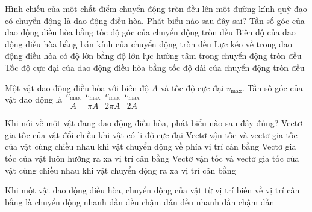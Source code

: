 \begin{ex}
Hình chiếu của một chất điểm chuyển động tròn đều lên một đường kính quỹ đạo có chuyển động là dao động điều hòa. Phát biểu nào sau đây sai?
\choice
{Tần số góc của dao động điều hòa bằng tốc độ góc của chuyển động tròn đều}
{Biên độ của dao động điều hòa bằng bán kính của chuyển động tròn đều}
{\True Lực kéo về trong dao động điều hòa có độ lớn bằng độ lớn lực hướng tâm trong chuyển động tròn đều}
{Tốc độ cực đại của dao động điều hòa bằng tốc độ dài của chuyển động tròn đều}
\end{ex}

\begin{ex}
Một vật dao động điều hòa với biên độ $A$ và tốc độ cực đại $v_{\max}$. Tần số góc của vật dao động là
\choice
{\True $\dfrac{v_{\max}}{A}$}
{$\dfrac{v_{\max}}{\pi A}$}
{$\dfrac{v_{\max}}{2\pi A}$}
{$\dfrac{v_{\max}}{2A}$}
\end{ex}

\begin{ex}
Khi nói về một vật đang dao động điều hòa, phát biểu nào sau đây đúng?
\choice
{Vectơ gia tốc của vật đổi chiều khi vật có li độ cực đại}
{\True Vectơ vận tốc và vectơ gia tốc của vật cùng chiều nhau khi vật chuyển động về phía vị trí cân bằng}
{Vectơ gia tốc của vật luôn hướng ra xa vị trí cân bằng}
{Vectơ vận tốc và vectơ gia tốc của vật cùng chiều nhau khi vật chuyển động ra xa vị trí cân bằng}
\end{ex}

\begin{ex}
Khi một vật dao động điều hòa, chuyển động của vật từ vị trí biên về vị trí cân bằng là chuyển động
\choice
{nhanh dần đều}
{chậm dần đều}
{\True nhanh dần}
{chậm dần}
\end{ex}

